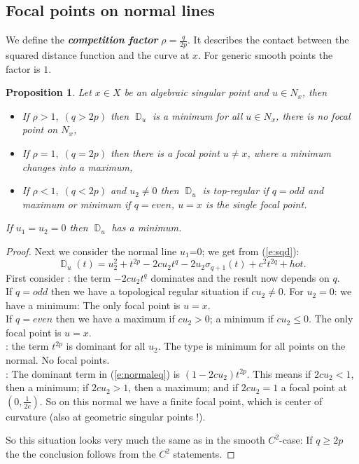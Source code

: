 \documentclass[12pt,a4,twoside]{amsart}
\DeclareMathOperator{\sq}{\mathbb{D}}
\newtheorem{prop}{Proposition}
\newtheorem*{main lemma}{The main lemma}
\begin{document}
\subsection{Focal points on normal lines}
We define the   \textit{\bf competition factor}
 $\rho = \frac{q}{2p}$. It describes  the contact between the squared distance function and the curve at $x$. For generic smooth points the factor is $1$.

 \begin{prop}\label{p:focal}
  Let $x \in X$ be an algebraic singular point and $u \in N_x$, then 
  \begin{itemize}
\item If  $\rho > 1,  \; (q > 2p)$  then $\sq_u$ is a minimum for all $u \in N_x$, there is no focal point on $N_x$,
\item If $\rho = 1, \; (q = 2p)$ then there is a focal point $u \ne x$, where a minimum changes into  a maximum,
\item If $\rho < 1, \;(q < 2p)$ and $u_2 \ne 0$ then $\sq_u$ is top-regular if $q=odd$ and maximum or minimum if $q= even$, $u=x$ is the  single focal point.
\end{itemize}
If $u_1=u_2=0$ then $\sq_u$ has a minimum.

  \end{prop}
\begin{proof}
Next we consider the normal line $u_1$=0;  we get from (\ref{e:sqd}):
\begin{equation}\label{e:normaleq}
 \sq_u(t)  =  u_2^2 + t^{2p}  - 2 c u_2 t^q    -2 u_2 \sigma_{q+1}(t)   +c^2  t^{2q} + hot  .
 \end{equation}
 First consider 
 : the  term $-2 c u_2 t^q$  dominates and the result now depends on $q$. \\
  If $q = odd$ then we have a topological regular situation if $c u_2 \ne 0$. For $u_2=0$:  we have a minimum: The only focal point is $u=x$.\\
  If $q = even$ then we have a maximum if $c u_2 >0$; a minimum if $c u_2\le  0$. The only focal point is $u=x$.\\
: the term $t^{2p}$ is dominant for all $u_2$. The type is minimum for all points on the normal. No focal points.\\
:
 The dominant term in (\ref{e:normaleq})  is $(1-2 c u_2) t^{2p}$. This means if $2 c u_2 < 1$,  then a minimum; if $2c  u_2 > 1$, then  a maximum;  and if $2 c u_2 =1$ a focal point at $(0,\frac{1}{2c})$.
 So on this normal we have a finite focal point, which is center of curvature (also at geometric singular points !).

 So this situation looks very much the same as in the smooth $C^2$-case:
  If $q \ge 2p$ the the conclusion follows from the $C^2$ statements.
  \end{proof}
\end{document}
